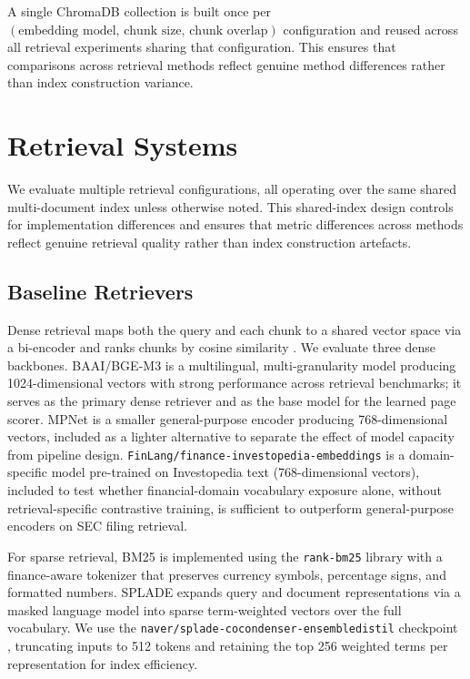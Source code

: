 \documentclass[12pt,twoside,maitrise]{dms}
\theoremstyle{definition}
\numberwithin{equation}{section}
\numberwithin{table}{chapter}
\numberwithin{figure}{chapter}
\begin{document}
A single ChromaDB collection is built once per
$(\text{embedding model},\, \text{chunk size},\, \text{chunk overlap})$ configuration
and reused across all retrieval experiments sharing that configuration. This ensures that
comparisons across retrieval methods reflect genuine method differences rather than index
construction variance.

\section{Retrieval Systems}
\label{sec:retrieval_systems}

We evaluate multiple retrieval configurations, all operating over the same shared
multi-document index unless otherwise noted. This shared-index design controls for
implementation differences and ensures that metric differences across methods reflect
genuine retrieval quality rather than index construction artefacts.

\subsection{Baseline Retrievers}

Dense retrieval maps both the query and each chunk to a shared vector space via a
bi-encoder and ranks chunks by cosine similarity \citep{karpukhin2020dense}. We
evaluate three dense backbones. BAAI/BGE-M3 \citep{chen2024bge} is a multilingual,
multi-granularity model producing 1024-dimensional vectors with strong performance
across retrieval benchmarks; it serves as the primary dense retriever and as the base
model for the learned page scorer. MPNet is a smaller general-purpose encoder producing
768-dimensional vectors, included as a lighter alternative to separate the effect of
model capacity from pipeline design. \texttt{FinLang/finance-investopedia-embeddings} \citep{finlang_investopedia_2024}
is a domain-specific model pre-trained on Investopedia text (768-dimensional vectors),
included to test whether financial-domain vocabulary exposure alone, without
retrieval-specific contrastive training, is sufficient to outperform general-purpose
encoders on SEC filing retrieval.

For sparse retrieval, BM25 \citep{robertson2009probabilistic} is implemented using the \texttt{rank-bm25} library with
a finance-aware tokenizer that preserves currency symbols, percentage signs, and
formatted numbers. SPLADE \citep{formal2021splade} expands query and document
representations via a masked language model into sparse term-weighted vectors over the
full vocabulary. We use the \texttt{naver/splade-cocondenser-ensembledistil} checkpoint \citep{https://doi.org/10.48550/arxiv.2205.04733},
truncating inputs to 512 tokens and retaining the top 256 weighted terms per
representation for index efficiency.
\end{document}
